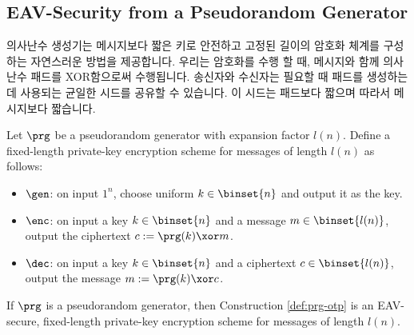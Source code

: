 \newpage
\subsection*{EAV-Security from a Pseudorandom Generator}

의사난수 생성기는 메시지보다 짧은 키로 안전하고 고정된 길이의 암호화 체계를 구성하는 자연스러운 방법을 제공합니다. 우리는 암호화를 수행 할 때, 메시지와 함께 의사난수 패드를 XOR함으로써 수행됩니다. 송신자와 수신자는 필요할 때 패드를 생성하는 데 사용되는 균일한 시드를 공유할 수 있습니다. 이 시드는 패드보다 짧으며 따라서 메시지보다 짧습니다.

\begin{construction} \label{def:prg-otp}
    Let $\prg$ be a pseudorandom generator with expansion factor $l(n)$. Define a fixed-length private-key encryption scheme for messages of length $l(n)$ as follows:
    \begin{itemize}
        \item $\gen$: on input $1^n$, choose uniform $k \in \binset{n}$ and output it as the key.
        \item $\enc$: on input a key $k \in \binset{n}$ and a message $m \in \binset{l(n)}$, output the ciphertext $c:= \prg(k) \xor m$.
        \item $\dec$: on input a key $k \in \binset{n}$ and a ciphertext $c \in \binset{l(n)}$, output the message $m := \prg(k) \xor c$.
    \end{itemize}
\end{construction}

\begin{theorem}
    If $\prg$ is a pseudorandom generator, then Construction \ref{def:prg-otp} is an EAV-secure, fixed-length private-key encryption scheme for messages of length $l(n)$.
\end{theorem}

